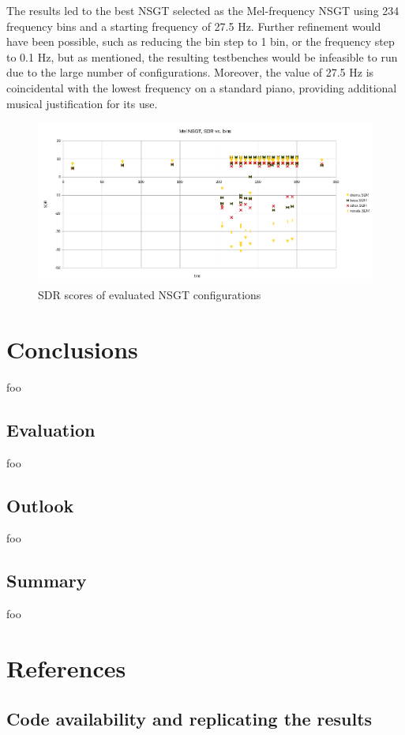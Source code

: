 \documentclass[letter,12pt,notitlepage]{article}
\begin{document}
The results led to the best NSGT selected as the Mel-frequency NSGT using 234 frequency bins and a starting frequency of 27.5 Hz. Further refinement would have been possible, such as reducing the bin step to 1 bin, or the frequency step to 0.1 Hz, but as mentioned, the resulting testbenches would be infeasible to run due to the large number of configurations. Moreover, the value of 27.5 Hz is coincidental with the lowest frequency on a standard piano, providing additional musical justification for its use.

\begin{figure}[ht]
	\centering
	\includegraphics[width=16cm]{./mel_nsgt_params.png}
	\caption{SDR scores of evaluated NSGT configurations}
	\label{fig:melnsgt}
\end{figure}


\vfill
\clearpage

\section{Conclusions}
\label{sec:conclusion}

foo

\subsection{Evaluation}

foo

\subsection{Outlook}

foo

\subsection{Summary}

foo

\vfill
\clearpage %

\section{References}
\printbibliography[heading=none]

\vfill
\clearpage %

\begin{appendices}

\section{Code availability and replicating the results}
\label{appendix:coderesultsrepro}

\end{appendices}
\end{document}
